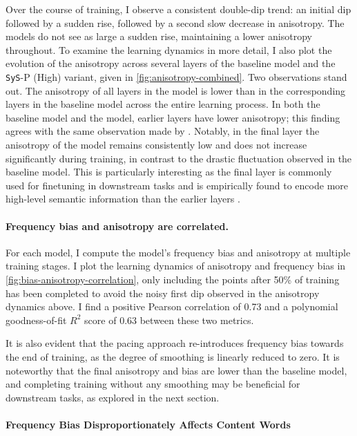 Over the course of training, I observe a consistent double-dip trend: an initial dip followed by a sudden rise, followed by a second slow decrease in anisotropy. The \smoothing models do not see as large a sudden rise, maintaining a lower anisotropy throughout. To examine the learning dynamics in more detail, I also plot the evolution of the anisotropy across several layers of the baseline model and the \texttt{SyS}-P (High) variant, given in \cref{fig:anisotropy-combined}. Two observations stand out. The anisotropy of all layers in the \smoothing model is lower than in the corresponding layers in the baseline model across the entire learning process. In both the baseline model and the \smoothing model, earlier layers have lower anisotropy; this finding agrees with the same observation made by \citet{ethayarajh2019contextual}. Notably, in the final layer the anisotropy of the \smoothing model remains consistently low and does not increase significantly during training, in contrast to the drastic fluctuation observed in the baseline model. This is particularly interesting as the final layer is commonly used for finetuning in downstream tasks and is empirically found to encode more high-level semantic information than the earlier layers \citep{clark2019does}. 

\paragraph{Frequency bias and anisotropy are correlated.}

For each model, I compute the model's frequency bias and anisotropy at multiple training stages. I plot the learning dynamics of anisotropy and frequency bias in \cref{fig:bias-anisotropy-correlation}, only including the points after 50\% of training has been completed to avoid the noisy first dip observed in the anisotropy dynamics above. I find a positive Pearson correlation of 0.73 and a polynomial goodness-of-fit $R^2$ score of 0.63 between these two metrics.

It is also evident that the pacing approach re-introduces frequency bias towards the end of training, as the degree of smoothing is linearly reduced to zero. It is noteworthy that the final anisotropy and bias are lower than the baseline model, and completing training without any smoothing may be beneficial for downstream tasks, as explored in the next section.

\paragraph{Frequency Bias Disproportionately Affects Content Words}
\label{sec:word-class-versus-word-frequency}


